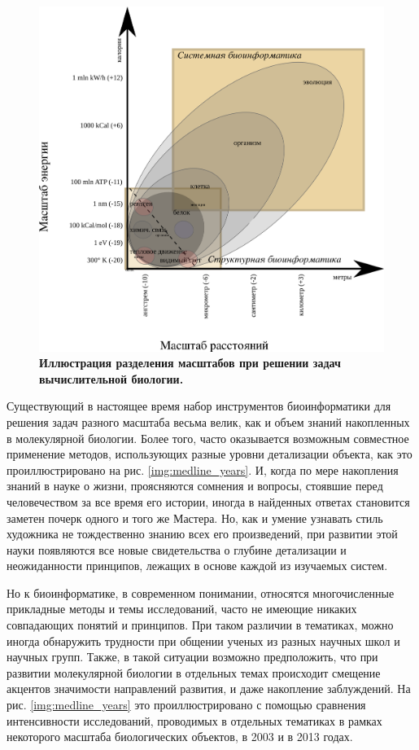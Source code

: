 \documentclass[a4paper,12pt,oneside,openany]{memoir}
\begin{document}
\begin{figure}[H]
  \centering
  \vskip 12pt 
  \includegraphics [width=0.8\linewidth]{bio_hier_scheme.png}
  \vskip 12pt
  \caption[m1]{
  \textbf{Иллюстрация разделения масштабов при решении задач вычислительной биологии.}\itshape
}
 \label{img:bio_hier_scheme}
\end{figure}

Существующий в настоящее время набор инструментов биоинформатики для решения задач разного масштаба весьма велик, как и объем знаний накопленных в молекулярной биологии. Более того, часто оказывается возможным совместное применение методов, использующих разные уровни детализации объекта, как это проиллюстрировано на рис. \ref{img:medline_years}. И, когда по мере накопления знаний в науке о жизни, проясняются сомнения и вопросы, стоявшие перед человечеством за все время его истории, иногда в найденных ответах становится заметен почерк одного и того же Мастера. Но, как и умение узнавать стиль художника не тождественно знанию всех его произведений, при развитии этой науки появляются все новые свидетельства о глубине детализации и неожиданности принципов, лежащих в основе каждой из изучаемых систем.

Но к биоинформатике, в современном понимании, относятся многочисленные прикладные методы и темы исследований, часто не имеющие никаких совпадающих понятий и принципов. При таком различии в тематиках, можно иногда обнаружить трудности при общении ученых из разных научных школ и научных групп. Также, в такой ситуации возможно предположить, что при развитии молекулярной биологии в отдельных темах происходит смещение акцентов значимости направлений развития, и даже накопление заблуждений. На рис. \ref{img:medline_years} это проиллюстрировано с помощью сравнения интенсивности исследований, проводимых в отдельных тематиках в рамках некоторого масштаба биологических объектов, в 2003 и в 2013 годах. 
\end{document}
